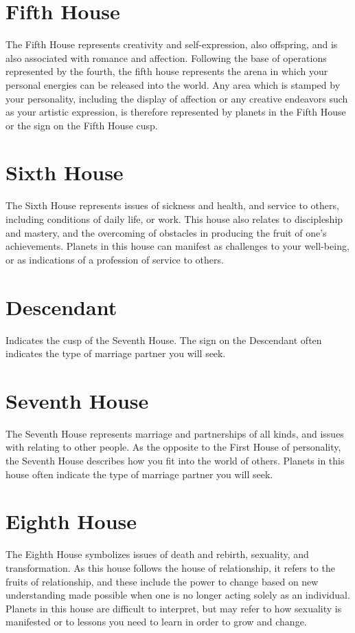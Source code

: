 \documentclass[12pt,twoside,openright]{memoir}
\begin{document}
\section {Fifth House}
The Fifth House represents creativity and self-expression, also offspring, and is also associated with romance and affection. Following the base of operations represented by the fourth, the fifth house represents the arena in which your personal energies can be released into the world. Any area which is stamped by your personality, including the display of affection or any creative endeavors such as your artistic expression, is therefore represented by planets in the Fifth House or the sign on the Fifth House cusp.

\section {Sixth House}
The Sixth House represents issues of sickness and health, and service to others, including conditions of daily life, or work. This house also relates to discipleship and mastery, and the overcoming of obstacles in producing the fruit of one's achievements. Planets in this house can manifest as challenges to your well-being, or as indications of a profession of service to others.

\section {Descendant}
Indicates the cusp of the Seventh House. The sign on the Descendant often indicates the type of marriage partner you will seek.

\section {Seventh House}
The Seventh House represents marriage and partnerships of all kinds, and issues with relating to other people. As the opposite to the First House of personality, the Seventh House describes how you fit into the world of others. Planets in this house often indicate the type of marriage partner you will seek.

\section {Eighth House}
The Eighth House symbolizes issues of death and rebirth, sexuality, and transformation. As this house follows the house of relationship, it refers to the fruits of relationship, and these include the power to change based on new understanding made possible when one is no longer acting solely as an individual. Planets in this house are difficult to interpret, but may refer to how sexuality is manifested or to lessons you need to learn in order to grow and change.
\end{document}

